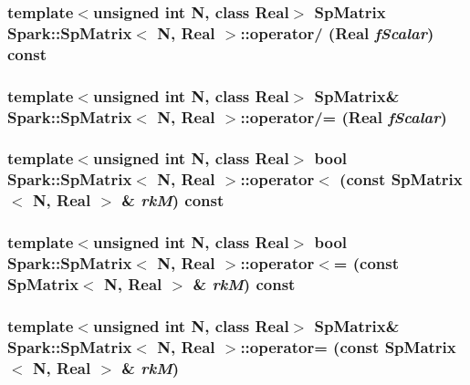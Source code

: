 \subsubsection{\setlength{\rightskip}{0pt plus 5cm}template$<$unsigned int N, class Real$>$ {\bf Sp\-Matrix} {\bf Spark::Sp\-Matrix}$<$ N, Real $>$::operator/ (Real {\em f\-Scalar}) const}\label{classSpark_1_1SpMatrix_a24}


\subsubsection{\setlength{\rightskip}{0pt plus 5cm}template$<$unsigned int N, class Real$>$ {\bf Sp\-Matrix}\& {\bf Spark::Sp\-Matrix}$<$ N, Real $>$::operator/= (Real {\em f\-Scalar})}\label{classSpark_1_1SpMatrix_a29}


\subsubsection{\setlength{\rightskip}{0pt plus 5cm}template$<$unsigned int N, class Real$>$ bool {\bf Spark::Sp\-Matrix}$<$ N, Real $>$::operator$<$ (const {\bf Sp\-Matrix}$<$ N, Real $>$ \& {\em rk\-M}) const}\label{classSpark_1_1SpMatrix_a16}


\subsubsection{\setlength{\rightskip}{0pt plus 5cm}template$<$unsigned int N, class Real$>$ bool {\bf Spark::Sp\-Matrix}$<$ N, Real $>$::operator$<$= (const {\bf Sp\-Matrix}$<$ N, Real $>$ \& {\em rk\-M}) const}\label{classSpark_1_1SpMatrix_a17}


\subsubsection{\setlength{\rightskip}{0pt plus 5cm}template$<$unsigned int N, class Real$>$ {\bf Sp\-Matrix}\& {\bf Spark::Sp\-Matrix}$<$ N, Real $>$::operator= (const {\bf Sp\-Matrix}$<$ N, Real $>$ \& {\em rk\-M})}\label{classSpark_1_1SpMatrix_a13}


